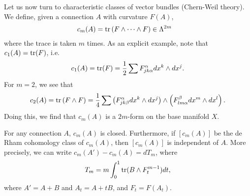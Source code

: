 \documentclass{../mathnotes}
\begin{document}
Let us now turn to characteristic classes of vector bundles (Chern-Weil theory). We define, given a connection $A$ with curvature $F(A)$,
\begin{align*}
    c_m(A)&=\operatorname{tr}\left( F\wedge\cdots \wedge F \right)\in\Lambda^{2m}
\end{align*}
where the trace is taken $m$ times. As an explicit example, note that $c_1(A)=\operatorname{tr}(F)$, i.e.
\[c_1(A)=\operatorname{tr}(F)=\frac{1}{2}\sum F_{jk\alpha}^\alpha dx^k\wedge dx^j.\]
For $m=2$, we see that
\begin{align*}
    c_2(A)=\operatorname{tr}\left( F\wedge F \right)=\frac{1}{4}\sum\left( F_{jk\beta}^\alpha dx^k\wedge dx^j \right)\wedge \left( F_{lm\alpha}^\beta dx^m\wedge dx^l \right).
\end{align*}
Doing this, we find that $c_m(A)$ is a $2m$-form on the base manifold $X$.
\begin{thm}
    For any connection $A$, $c_m(A)$ is closed. Furthermore, if $[c_m(A)]$ be the de Rham cohomology class of $c_m(A)$,
    then $[c_m(A)]$ is independent of $A$. More precisely, we can write $c_m(A')-c_m(A)=dT_m$, where
    \[T_m=m\int^1_0\operatorname{tr}(B\wedge F_t^{m-1}) dt,\]
    where $A'=A+B$ and $A_t=A+tB$, and $F_t=F(A_t)$.
\end{thm}
\end{document}

